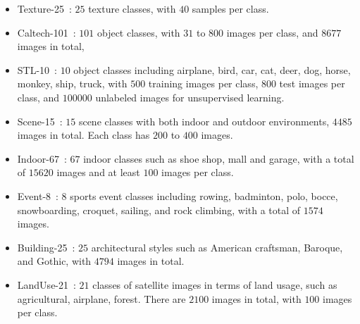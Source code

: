 \documentclass[preprint,12pt,3p]{elsarticle}
\begin{document}
\begin{itemize}
\item Texture-25~\citep{UIUC:Texture}: $25$
texture classes, with $40$ samples per class.

\item Caltech-101~\citep{FeiFei2004}: $101$ object classes, with
  $31$ to $800$ images per class, and $8677$ images in total,

\item STL-10~\citep{stl-10}: $10$ object classes including airplane, bird,
  car, cat, deer, dog, horse, monkey, ship, truck, with $500$ training
  images per class, $800$ test images per class, and $100000$
  unlabeled images for unsupervised learning.

\item Scene-15~\citep{lazebnik:cvpr06}: $15$ scene classes with both
  indoor and outdoor environments, $4485$ images in total. Each
  class has $200$ to $400$ images.


\item Indoor-67~\citep{Indoor}: $67$ indoor classes such as shoe
  shop, mall and garage, with a total of $15620$ images and at least
  $100$ images per class.

\item Event-8~\citep{event-8}: $8$ sports event classes including rowing,
  badminton, polo, bocce, snowboarding, croquet, sailing, and rock
  climbing, with a total of $1574$ images. 


\item Building-25~\citep{building-25}: $25$ architectural styles such
  as American craftsman, Baroque, and Gothic, with $4794$ images in
  total.

\item LandUse-21~\citep{landuse21}: $21$ classes of satellite images in
  terms of land usage, such as agricultural, airplane, forest. There
  are $2100$ images in total, with $100$ images per class.

\end{itemize}
\end{document}
